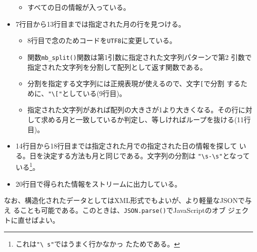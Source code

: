\begin{Exec}
\begin{itemize}
\begin{itemize}
 \item すべての日の情報が入っている。
\end{itemize}
 \item 7行目から13行目までは指定された月の行を見つける。
\begin{itemize}
 \item 8行目で念のためコードを\texttt{UTF8}に変更している。
 \item 関数\Verb+mb_split()+関数は第1引数に指定された文字列パターンで第2
       引数で指定された文字列を分割して配列として返す関数である。
 \item 分割を指定する文字列には正規表現が使えるので、文字\Verb+[+で分割
       するために、\Verb+"\["+としている(9行目)。
 \item 指定された文字列があれば配列の大きさが1より大きくなる。その行に対
       して求める月と一致しているか判定し、等しければループを抜ける(11行
       目)。
\end{itemize}
 \item 14行目から18行目までは指定された月での指定された日の情報を探して
       いる。日を決定する方法も月と同じである。文字列の分割は
       \Verb+"\s-\s"+となっている\footnote{これは\texttt{"\textbackslash
       s"}ではうまく行かなかっ
       たためである。}。
 \item 20行目で得られた情報をストリームに出力している。
\end{itemize}
\end{Exec}
なお、構造化されたデータとしてはXML形式でもよいが、より軽量なJSONで与え
ることも可能である。このときは、\texttt{JSON.parse()}でJavaScriptのオブ
ジェクトに直せばよい。


